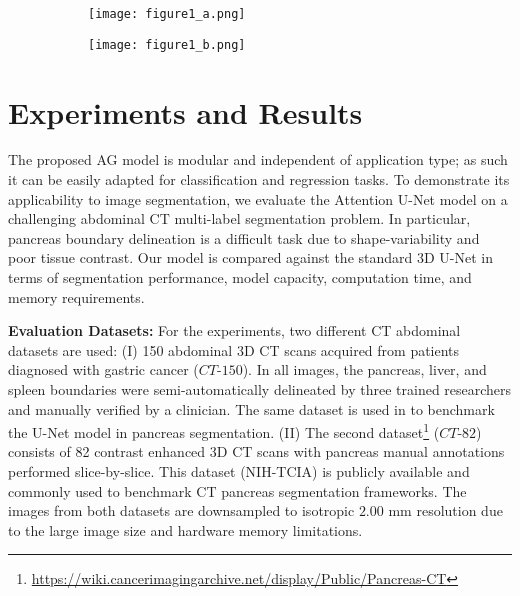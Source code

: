 \documentclass{article}
\begin{document}
\begin{figure}[t]
	\centering
	\begin{subfigure}{0.628\linewidth}
		\centering
		\texttt{[image: figure1\_a.png]}
		\label{fig:attention_activations}
	\end{subfigure}
	\hfill
	\begin{subfigure}{0.360\linewidth}
		\centering
		\texttt{[image: figure1\_b.png]}
		\label{fig:qualitative_comparison}
	\end{subfigure}
\end{figure}

\section{Experiments and Results}

The proposed AG model is modular and independent of application type; as such it can be easily adapted for classification and regression tasks. To demonstrate its applicability to image segmentation, we evaluate the Attention U-Net model on a challenging abdominal CT multi-label segmentation problem. In particular, pancreas boundary delineation is a difficult task due to shape-variability and poor tissue contrast. Our model is compared against the standard 3D U-Net in terms of segmentation performance, model capacity, computation time, and memory requirements. 

\textbf{Evaluation Datasets:} For the experiments, two different CT abdominal datasets are used: (I) 150 abdominal 3D CT scans acquired from patients diagnosed with gastric cancer ($CT$-$150$). In all images, the pancreas, liver, and spleen boundaries were semi-automatically delineated by three trained researchers and manually verified by a clinician. The same dataset is used in \cite{roth2017hierarchical} to benchmark the U-Net model in pancreas segmentation. (II) The second dataset\footnote{\url{https://wiki.cancerimagingarchive.net/display/Public/Pancreas-CT}} ($CT$-$82$) consists of 82 contrast enhanced 3D CT scans with pancreas manual annotations performed slice-by-slice. This dataset (NIH-TCIA) \cite{tciapancreas} is publicly available and commonly used to benchmark CT pancreas segmentation frameworks. The images from both datasets are downsampled to isotropic $2.00$ mm resolution due to the large image size and hardware memory limitations. 
\end{document}
